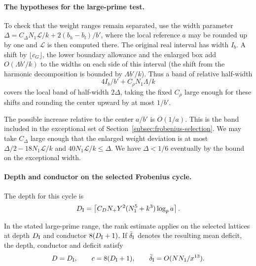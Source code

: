 \paragraph{The hypotheses for the large-prime test.}
To check that the weight ranges remain separated, use the width parameter
\(\Delta=C_{\Delta}N_1\mathcal L/k+2(b_h-b_l)/b'\),
where the local reference \(a\) may be rounded up by one and
\(\mathcal L\) is then computed there. The original real interval
has width \(I_b\). A shift by \(\lfloor c_G\rfloor\), the lower
boundary allowance and the enlarged box add \(O(\Lambda b'/k)\)
to the widths on each side of this interval
(the shift from the harmonic decomposition is bounded by
\(\Lambda b'/k\)). Thus a band of relative half-width
\[
          4I_b/b'+C_\rho N_1\Lambda/k
\]
covers the local band of half-width \(2\Delta\), taking the
fixed \(C_\rho\) large enough for these shifts and rounding
the center upward by at most \(1/b'\).

The possible increase
relative to the center \(a/b'\) is \(O(1/a)\).
This is the band included in the exceptional set of
Section~\ref{subsec:frobenius-selection}. We may take
\(C_\Delta\) large enough that the enlarged weight deviation
is at most \(\Delta/2-18N_1\mathcal L/k\) and
\(40N_1\mathcal L/k\le\Delta\). We have \(\Delta<1/6\)
eventually by the bound on the exceptional width.

\paragraph{Depth and conductor on the selected Frobenius cycle.}
The depth for this cycle is
\[
 D_{\rm I}=\left\lceil C_D N_+Y^2(N_1^5+k^3)\log_p a\right\rceil .
\]
\begin{proposition}
\label{prop:host-large-prime-test}
In the stated large-prime range, the rank estimate applies
on the selected lattices at depth \(D_{\rm I}\) and conductor
\(8(D_{\rm I}+1)\). If \(\bar\delta_{\rm I}\) denotes the resulting mean deficit, the depth, conductor and deficit satisfy
\[
 D=D_{\rm I},\qquad c=8(D_{\rm I}+1),\qquad\bar\delta_{\rm I}=O(NN_1/x^{13}).
\]

\end{proposition}

